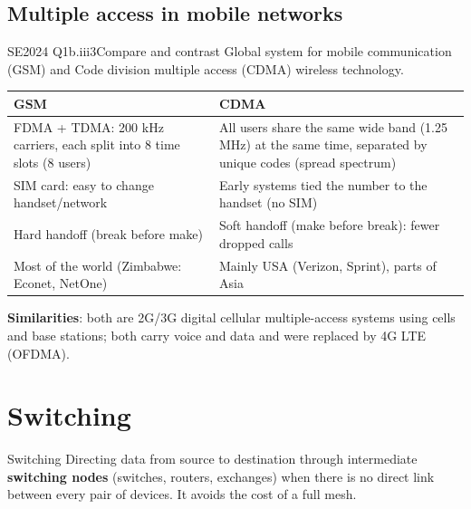 \documentclass[10pt]{article}
\begin{document}
\subsection{Multiple access in mobile networks}

\begin{pastq}{SE2024 Q1b.iii}{3}Compare and contrast Global system for mobile communication (GSM) and Code division multiple access (CDMA) wireless technology.\end{pastq}
\begin{ans}
\begin{tabularx}{\linewidth}{@{}XX@{}}
\toprule
\textbf{GSM} & \textbf{CDMA}\\\midrule
FDMA + TDMA: 200 kHz carriers, each split into 8 time slots (8 users) & All users share the same wide band (1.25 MHz) at the same time, separated by unique codes (spread spectrum)\\
SIM card: easy to change handset/network & Early systems tied the number to the handset (no SIM)\\
Hard handoff (break before make) & Soft handoff (make before break): fewer dropped calls\\
Most of the world (Zimbabwe: Econet, NetOne) & Mainly USA (Verizon, Sprint), parts of Asia\\
\bottomrule
\end{tabularx}
\textbf{Similarities}: both are 2G/3G digital cellular multiple-access systems using cells and base stations; both carry voice and data and were replaced by 4G LTE (OFDMA).
\end{ans}

\section{Switching}

\begin{keydef}{Switching}
Directing data from source to destination through intermediate \textbf{switching nodes} (switches, routers, exchanges) when there is no direct link between every pair of devices. It avoids the cost of a full mesh.
\end{keydef}
\end{document}
